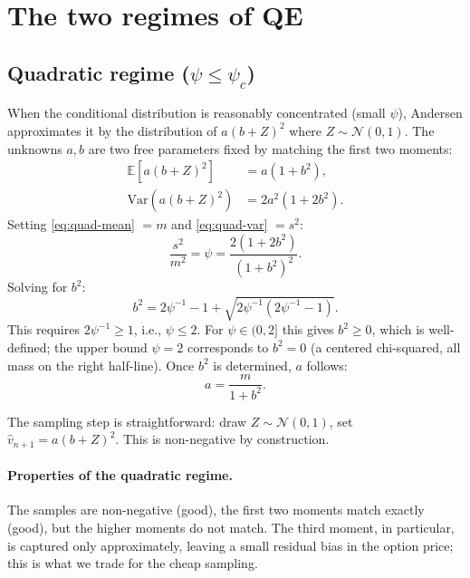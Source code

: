 \documentclass[11pt]{article}
\theoremstyle{plain}
\theoremstyle{definition}
\theoremstyle{remark}
\begin{document}
\section{The two regimes of QE}

\subsection{Quadratic regime ($\psi \leq \psi_c$)}

When the conditional distribution is reasonably concentrated (small $\psi$), Andersen approximates it by the distribution of $a(b + Z)^2$ where $Z \sim \mathcal{N}(0, 1)$. The unknowns $a, b$ are two free parameters fixed by matching the first two moments:
\begin{align}
    \mathbb{E}[a(b + Z)^2] &= a(1 + b^2),                                                                       \label{eq:quad-mean}\\
    \mathrm{Var}(a(b + Z)^2) &= 2 a^2 (1 + 2 b^2).                                                              \label{eq:quad-var}
\end{align}
Setting \eqref{eq:quad-mean} $= m$ and \eqref{eq:quad-var} $= s^2$:
\[
    \frac{s^2}{m^2} = \psi = \frac{2(1 + 2b^2)}{(1 + b^2)^2}.
\]
Solving for $b^2$:
\begin{equation}
    b^2 = 2\psi^{-1} - 1 + \sqrt{2\psi^{-1}(2\psi^{-1} - 1)}.                                                   \label{eq:b2}
\end{equation}
This requires $2\psi^{-1} \geq 1$, i.e., $\psi \leq 2$. For $\psi \in (0, 2]$ this gives $b^2 \geq 0$, which is well-defined; the upper bound $\psi = 2$ corresponds to $b^2 = 0$ (a centered chi-squared, all mass on the right half-line). Once $b^2$ is determined, $a$ follows:
\begin{equation}
    a = \frac{m}{1 + b^2}.                                                                                      \label{eq:a-quad}
\end{equation}

The sampling step is straightforward: draw $Z \sim \mathcal{N}(0, 1)$, set $\hat v_{n+1} = a(b + Z)^2$. This is non-negative by construction.

\paragraph{Properties of the quadratic regime.} The samples are non-negative (good), the first two moments match exactly (good), but the higher moments do not match. The third moment, in particular, is captured only approximately, leaving a small residual bias in the option price; this is what we trade for the cheap sampling.
\end{document}
